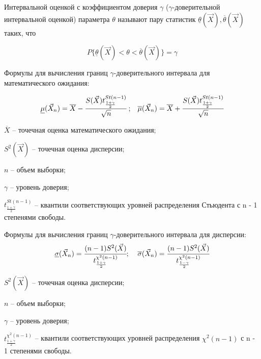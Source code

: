 Интервальной оценкой с коэффициентом доверия $\gamma$ ($\gamma$-доверительной интервальной оценкой) параметра $\theta$ называют пару статистик $\underline{\theta}(\vec X), \overline{\theta}(\vec X)$ таких, что

$$P\{\underline{\theta}(\vec X)< \theta< \overline{\theta}(\vec X)\}=\gamma$$ 

Формулы для вычисления границ $\gamma$-доверительного интервала для математического ожидания:

\begin{equation}
	\begin{array}{cc}
		\underline\mu(\vec X_n)=\overline X - \cfrac{S(\vec X)t^{St(n-1)}_{\frac{1+\gamma}{2}}}{\sqrt{n}}\; ; & \overline\mu(\vec X_n)=\overline X + \cfrac{S(\vec X)t^{St(n-1)}_{\frac{1+\gamma}{2}}}{\sqrt{n}}
	\end{array}
\end{equation}

$\overline X$ -- точечная оценка математического ожидания;

$S^2(\vec X)$ -- точечная оценка дисперсии;

$n$ -- объем выборки;

$\gamma$ -- уровень доверия;

$t^{St(n-1)}_{\frac{1+\gamma}{2}}$ -- квантили соответствующих уровней распределения Стьюдента с n - 1 степенями свободы.

Формулы для вычисления границ $\gamma$-доверительного интервала для дисперсии:
\begin{equation}
	\begin{array}{cc}
		\underline\sigma(\vec X_n)= \cfrac{(n-1)S^2(\vec X)}{t^{\chi^2(n-1)}_{\frac{1+\gamma}{2}}};\; & \overline\sigma(\vec X_n)= \cfrac{(n-1)S^2(\vec X)}{t^{\chi^2(n-1)}_{\frac{1-\gamma}{2}}}
	\end{array}
\end{equation}

$S^2(\vec X)$ -- точечная оценка дисперсии;

$n$ -- объем выборки;

$\gamma$ -- уровень доверия;

$t^{\chi^2(n-1)}_{\frac{1+\gamma}{2}}$ -- квантили соответствующих уровней распределения $\chi^2(n-1)$ с n - 1 степенями свободы.


